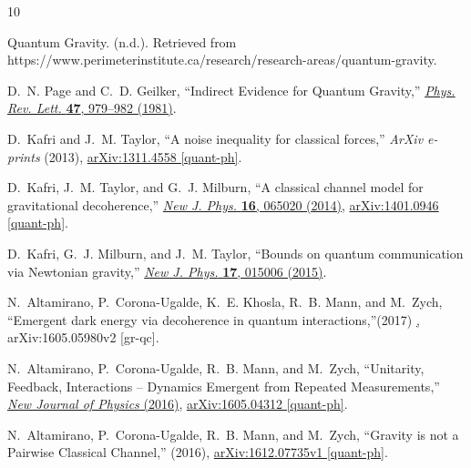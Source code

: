 \documentclass[aps, prd, superscriptaddress,twocolumn,amsmath,amssymb,nofootinbib]{revtex4-1}
\begin{document}
\begingroup\raggedright\begin{thebibliography}{10}


Quantum Gravity. (n.d.). Retrieved from https://www.perimeterinstitute.ca/research/research-areas/quantum-gravity.

D.~N. Page and C.~D. Geilker, ``{Indirect Evidence for Quantum Gravity},''
\href{http://dx.doi.org/10.1103/PhysRevLett.47.979}{{\em Phys. Rev. Lett.}
  {\bfseries 47}, 979--982 (1981)}.

D.~{Kafri} and J.~M. {Taylor}, ``{A noise inequality for classical forces},''
  {\em ArXiv e-prints} (2013), \href{http://arxiv.org/abs/1311.4558}{{\ttfamily
  arXiv:1311.4558 [quant-ph]}}.

D.~Kafri, J.~M. Taylor, and G.~J. Milburn, ``{A classical channel model for
  gravitational decoherence},''
  \href{http://dx.doi.org/10.1088/1367-2630/16/6/065020}{{\em New J. Phys.}
  {\bfseries 16}, 065020 (2014)},
\href{http://arxiv.org/abs/1401.0946}{{\ttfamily arXiv:1401.0946 [quant-ph]}}.

D.~Kafri, G.~J. Milburn, and J.~M. Taylor, ``{Bounds on quantum communication
  via Newtonian gravity},''
\href{http://dx.doi.org/10.1088/1367-2630/17/1/015006}{{\em New J. Phys.}
  {\bfseries 17}, 015006 (2015)}.

N.~Altamirano, P.~Corona-Ugalde, K.~E. Khosla, R.~B. Mann, and M.~Zych, ``{Emergent dark energy via decoherence in quantum
interactions},''{(2017)}
   \href{https://arxiv.org/pdf/1605.05980.pdf},
{{\ttfamily arXiv:1605.05980v2 [gr-qc]}}.

N.~Altamirano, P.~Corona-Ugalde, R.~B. Mann, and M.~Zych, ``{Unitarity,
  Feedback, Interactions -- Dynamics Emergent from Repeated Measurements},''
   \href{http://iopscience.iop.org/article/10.1088/1367-2630/aa551b}{{\em New Journal of Physics}
 (2016)},
\href{http://arxiv.org/abs/1605.04312}{{\ttfamily arXiv:1605.04312
  [quant-ph]}}.

N.~Altamirano, P.~Corona-Ugalde, R.~B. Mann, and M.~Zych, ``{Gravity is not a Pairwise Classical Channel},''
   {(2016)},
\href{http://arxiv.org/abs/1612.07735v1}{{\ttfamily arXiv:1612.07735v1
  [quant-ph]}}.


\end{thebibliography}
\end{document}
